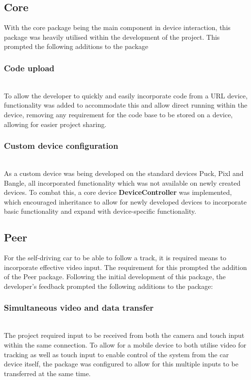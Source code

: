 \documentclass{l4proj}
\begin{document}
\subsection{Core}
With the core package being the main component in device interaction, this package was heavily utilised within the development of the project. This prompted the following additions to the package

\subsubsection{Code upload}\hfill\\
To allow the developer to quickly and easily incorporate code from a URL device, functionality was added to accommodate this and allow direct running within the device, removing any requirement for the code base to be stored on a device, allowing for easier project sharing.
\subsubsection{Custom device configuration}\hfill\\
As a custom device was being developed on the standard devices Puck, Pixl and Bangle, all incorporated functionality which was not available on newly created devices. To combat this, a core device \textbf{DeviceController} was implemented, which encouraged inheritance to allow for newly developed devices to incorporate basic functionality and expand with device-specific functionality.
\subsection{Peer}
For the self-driving car to be able to follow a track, it is required means to incorporate effective video input. The requirement for this prompted the addition of the Peer package. Following the initial development of this package, the developer's feedback prompted the following additions to the package:

\subsubsection{Simultaneous video and data transfer}\hfill\\
The project required input to be received from both the camera and touch input within the same connection. To allow for a mobile device to both utilise video for tracking as well as touch input to enable control of the system from the car device itself, the package was configured to allow for this multiple inputs to be transferred at the same time.
\end{document}
